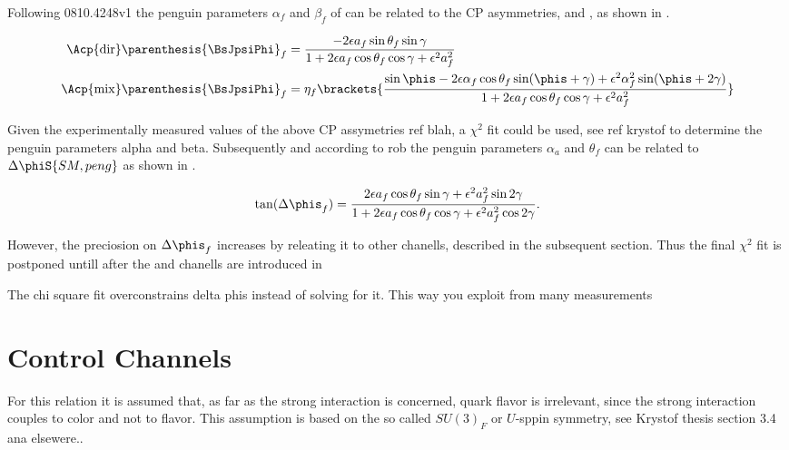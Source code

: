 Following {\color{red} 0810.4248v1} the penguin parameters $\alpha_f$ and $\beta_f$ of 
can be related to the CP asymmetries,  and ,
as shown in \equref{}.

\begin{align}
  \Acp{\rm dir}\parenthesis{\BsJpsiPhi}_f &= \frac{ -2\epsilon a_f \sin\theta_f \sin\gamma} {1 + 2\epsilon a_f \cos\theta_f \cos\gamma + \epsilon^2 a_f^{2}} \\
  \Acp{\rm mix}\parenthesis{\BsJpsiPhi}_f &= \eta_f \brackets{\frac{\sin\phis - 2\epsilon\alpha_f \cos\theta_f\sin(\phis+\gamma) + \epsilon^2\alpha_f^2 \sin(\phis+2\gamma)}
                                                                 {1 + 2\epsilon a_f \cos\theta_f \cos\gamma + \epsilon^2a_f^{2}} }
  \label{bsjpsiphi_peng_acp_obs}
\end{align}

Given the experimentally measured values of the above CP assymetries {\color{red} ref blah}, a $\chi^2$ fit could be used,
see ref {\color{red} krystof} to determine the penguin parameters alpha and beta. Subsequently and according to rob
the penguin parameters $\alpha_a$ and $\theta_f$ can be related to $\Delta\phiS{SM,peng}$ as shown in .

\begin{equation}
\tan(\Delta{\phis}_f) = \frac{2\epsilon a_f \cos\theta_f \sin\gamma+\epsilon^2 a^2_f \sin2\gamma}{1+2\epsilon a_f \cos\theta_f \cos\gamma+ \epsilon^2 a^2_f \cos2\gamma}.
\label{tandelta}
\end{equation}

However, the preciosion on $\Delta{\phis}_f$ increases by releating it to other chanells, described in the subsequent section.
Thus the final $\chi^2$ fit is postponed untill after the \BsJpsiKst and \BsJpsiRho chanells are introduced in 

{\color{red} The chi square fit overconstrains delta phis instead of solving for it. This way you exploit from many measurements}
\section{Control Channels}
\label{penguin_more_chanells}

For this relation it is assumed that, as far as the strong interaction is concerned, quark flavor is irrelevant,
since the strong interaction couples to color and not to flavor. This assumption is based on the so called $SU(3)_F$ or $U$-sppin symmetry,
see {\color{red} Krystof thesis section 3.4 ana elsewere.}.

